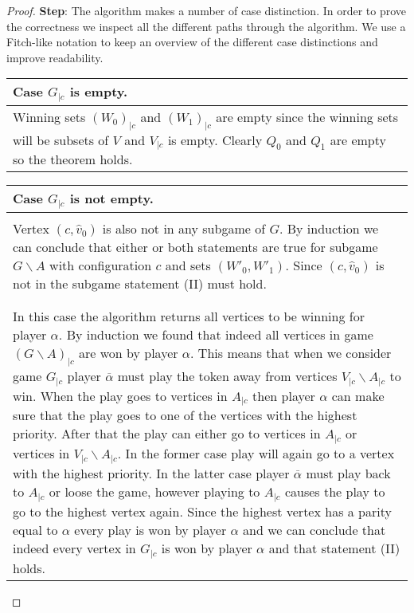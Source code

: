 \begin{theorem}
\begin{proof}
	\textbf{Step}: The algorithm makes a number of case distinction. In order to prove the correctness we inspect all the different paths through the algorithm. We use a Fitch-like notation to keep an overview of the different case distinctions and improve readability.\\
	\begin{longtable}{|p{15.2cm}}
		Case $G_{|c}$ is empty.\\
		\hline
		Winning sets $(W_0)_{|c}$ and $(W_1)_{|c}$ are empty since the winning sets will be subsets of $V$ and $V_{|c}$ is empty. Clearly $Q_0$ and $Q_1$ are empty so the theorem holds.
	\end{longtable}
	\begin{longtable}{|p{15.2cm}}
		Case $G_{|c}$ is not empty.\\
		\hline
		\begin{tabular}{|p{15cm}}
			Case $(c,\hat{v}_0) \notin V$\\
			\hline
			Vertex $(c,\hat{v}_0)$ is also not in any subgame of $G$. By induction we can conclude that either or both statements are true for subgame $G\backslash A$ with configuration $c$ and sets $(W'_0,W'_1)$. Since $(c,\hat{v}_0)$ is not in the subgame statement (II) must hold.\\\\
			\begin{tabular}{|p{14.8cm}}
				Case $W'_{\overline{\alpha}} = \emptyset$\\
				\hline
				In this case the algorithm returns all vertices to be winning for player $\alpha$. By induction we found that indeed all vertices in game $(G\backslash A)_{|c}$ are won by player $\alpha$. This means that when we consider game $G_{|c}$ player $\overline{\alpha}$ must play the token away from vertices $V_{|c} \backslash A_{|c}$ to win. When the play goes to vertices in $A_{|c}$ then player $\alpha$ can make sure that the play goes to one of the vertices with the highest priority. After that the play can either go to vertices in $A_{|c}$ or vertices in $V_{|c} \backslash A_{|c}$. In the former case play will again go to a vertex with the highest priority. In the latter case player $\overline{\alpha}$ must play back to $A_{|c}$ or loose the game, however playing to $A_{|c}$ causes the play to go to the highest vertex again. Since the highest vertex has a parity equal to $\alpha$ every play is won by player $\alpha$ and we can conclude that indeed every vertex in $G_{|c}$ is won by player $\alpha$ and that statement (II) holds.
			\end{tabular}

\end{tabular}
\end{longtable}
\end{proof}
\end{theorem}
